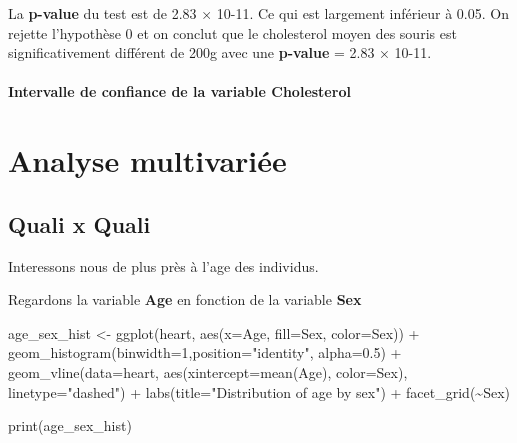 \documentclass[
]{article}
\newenvironment{Shaded}{\begin{snugshade}}{\end{snugshade}}
\newcommand{\AttributeTok}[1]{\textcolor[rgb]{0.77,0.63,0.00}{#1}}
\newcommand{\DecValTok}[1]{\textcolor[rgb]{0.00,0.00,0.81}{#1}}
\newcommand{\FloatTok}[1]{\textcolor[rgb]{0.00,0.00,0.81}{#1}}
\newcommand{\FunctionTok}[1]{\textcolor[rgb]{0.00,0.00,0.00}{#1}}
\newcommand{\NormalTok}[1]{#1}
\newcommand{\OtherTok}[1]{\textcolor[rgb]{0.56,0.35,0.01}{#1}}
\newcommand{\SpecialCharTok}[1]{\textcolor[rgb]{0.00,0.00,0.00}{#1}}
\newcommand{\StringTok}[1]{\textcolor[rgb]{0.31,0.60,0.02}{#1}}
\begin{document}
La \textbf{p-value} du test est de 2.83 × 10-11. Ce qui est largement
inférieur à 0.05. On rejette l'hypothèse 0 et on conclut que le
cholesterol moyen des souris est significativement différent de 200g
avec une \textbf{p-value} = 2.83 × 10-11.

\hypertarget{intervalle-de-confiance-de-la-variable-cholesterol-1}{%
\paragraph{\texorpdfstring{Intervalle de confiance de la variable
\textbf{Cholesterol}}{Intervalle de confiance de la variable Cholesterol}}\label{intervalle-de-confiance-de-la-variable-cholesterol-1}}

\hypertarget{analyse-multivariuxe9e}{%
\section{Analyse multivariée}\label{analyse-multivariuxe9e}}

\hypertarget{quali-x-quali}{%
\subsection{Quali x Quali}\label{quali-x-quali}}

Interessons nous de plus près à l'age des individus.

Regardons la variable \textbf{Age} en fonction de la variable
\textbf{Sex}

\begin{Shaded}
\begin{Highlighting}[]
\NormalTok{age\_sex\_hist }\OtherTok{\textless{}{-}} \FunctionTok{ggplot}\NormalTok{(heart, }\FunctionTok{aes}\NormalTok{(}\AttributeTok{x=}\NormalTok{Age, }\AttributeTok{fill=}\NormalTok{Sex, }\AttributeTok{color=}\NormalTok{Sex)) }\SpecialCharTok{+}
  \FunctionTok{geom\_histogram}\NormalTok{(}\AttributeTok{binwidth=}\DecValTok{1}\NormalTok{,}\AttributeTok{position=}\StringTok{"identity"}\NormalTok{, }\AttributeTok{alpha=}\FloatTok{0.5}\NormalTok{) }\SpecialCharTok{+}
  \FunctionTok{geom\_vline}\NormalTok{(}\AttributeTok{data=}\NormalTok{heart, }\FunctionTok{aes}\NormalTok{(}\AttributeTok{xintercept=}\FunctionTok{mean}\NormalTok{(Age), }\AttributeTok{color=}\NormalTok{Sex), }\AttributeTok{linetype=}\StringTok{"dashed"}\NormalTok{) }\SpecialCharTok{+}
  \FunctionTok{labs}\NormalTok{(}\AttributeTok{title=}\StringTok{"Distribution of age by sex"}\NormalTok{) }\SpecialCharTok{+}
  \FunctionTok{facet\_grid}\NormalTok{(}\SpecialCharTok{\textasciitilde{}}\NormalTok{Sex)}

\FunctionTok{print}\NormalTok{(age\_sex\_hist)}
\end{Highlighting}
\end{Shaded}
\end{document}
